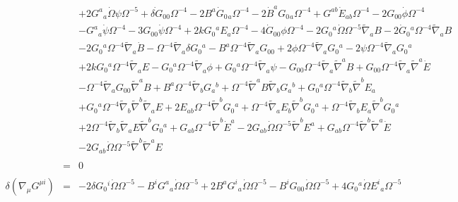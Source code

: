 \documentclass[10pt,letterpaper]{article}
\numberwithin{equation}{section}
\begin{document}
\begin{eqnarray}
&& + 2 G^{a}{}_{a} \dot{\Omega} \psi \Omega^{-5} + \dot{\delta G}_{00}{} \Omega^{-4} - 2 B^{a} \dot{G}_{0}{}_{a} \Omega^{-4} - 2 \dot{B}^{a} G_{0}{}_{a} \Omega^{-4} + G^{ab} \dot{E}_{ab} \Omega^{-4} - 2 G_{00}{} \dot{\phi} \Omega^{-4} \nonumber \\ 
&& -  G^{a}{}_{a} \dot{\psi} \Omega^{-4} - 3 G_{00}{} \dot{\psi} \Omega^{-4} + 2 k G_{0}{}^{a} E_{a} \Omega^{-4} - 4 \dot{G}_{00}{} \phi \Omega^{-4} - 2 G_{0}{}^{a} \dot{\Omega} \Omega^{-5} \tilde{\nabla}_{a}B - 2 \dot{G}_{0}{}^{a} \Omega^{-4} \tilde{\nabla}_{a}B \nonumber \\ 
&& - 2 G_{0}{}^{a} \Omega^{-4} \tilde{\nabla}_{a}\dot{B} -  \Omega^{-4} \tilde{\nabla}_{a}\delta G_{0}{}^{a} -  B^{a} \Omega^{-4} \tilde{\nabla}_{a}G_{00}{} + 2 \phi \Omega^{-4} \tilde{\nabla}_{a}G_{0}{}^{a} - 2 \psi \Omega^{-4} \tilde{\nabla}_{a}G_{0}{}^{a} \nonumber \\ 
&& + 2 k G_{0}{}^{a} \Omega^{-4} \tilde{\nabla}_{a}E -  G_{0}{}^{a} \Omega^{-4} \tilde{\nabla}_{a}\phi + G_{0}{}^{a} \Omega^{-4} \tilde{\nabla}_{a}\psi -  G_{00}{} \Omega^{-4} \tilde{\nabla}_{a}\tilde{\nabla}^{a}B + G_{00}{} \Omega^{-4} \tilde{\nabla}_{a}\tilde{\nabla}^{a}\dot{E} \nonumber \\ 
&& -  \Omega^{-4} \tilde{\nabla}_{a}G_{00}{} \tilde{\nabla}^{a}B + B^{a} \Omega^{-4} \tilde{\nabla}_{b}G_{a}{}^{b} + \Omega^{-4} \tilde{\nabla}^{a}B \tilde{\nabla}_{b}G_{a}{}^{b} + G_{0}{}^{a} \Omega^{-4} \tilde{\nabla}_{b}\tilde{\nabla}^{b}E_{a} \nonumber \\ 
&& + G_{0}{}^{a} \Omega^{-4} \tilde{\nabla}_{b}\tilde{\nabla}^{b}\tilde{\nabla}_{a}E + 2 E_{ab} \Omega^{-4} \tilde{\nabla}^{b}G_{0}{}^{a} + \Omega^{-4} \tilde{\nabla}_{a}E_{b} \tilde{\nabla}^{b}G_{0}{}^{a} + \Omega^{-4} \tilde{\nabla}_{b}E_{a} \tilde{\nabla}^{b}G_{0}{}^{a} \nonumber \\ 
&& + 2 \Omega^{-4} \tilde{\nabla}_{b}\tilde{\nabla}_{a}E \tilde{\nabla}^{b}G_{0}{}^{a} + G_{ab} \Omega^{-4} \tilde{\nabla}^{b}\dot{E}^{a} - 2 G_{ab} \dot{\Omega} \Omega^{-5} \tilde{\nabla}^{b}E^{a} + G_{ab} \Omega^{-4} \tilde{\nabla}^{b}\tilde{\nabla}^{a}\dot{E} \nonumber \\ 
&& - 2 G_{ab} \dot{\Omega} \Omega^{-5} \tilde{\nabla}^{b}\tilde{\nabla}^{a}E
\\  \nonumber\\ 
&=&0
\\  \nonumber\\ 
\delta(\nabla_\mu G^{\mu i})&=& -2 \delta G_{0}{}^{i} \dot{\Omega} \Omega^{-5} -  B^{i} G^{a}{}_{a} \dot{\Omega} \Omega^{-5} + 2 B^{a} G^{i}{}_{a} \dot{\Omega} \Omega^{-5} -  B^{i} G_{00}{} \dot{\Omega} \Omega^{-5} + 4 G_{0}{}^{a} \dot{\Omega} E^{i}{}_{a} \Omega^{-5} \nonumber \\ 

\end{eqnarray}
\end{document}
